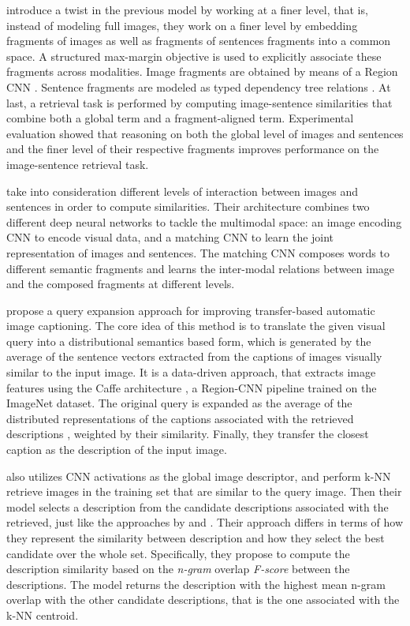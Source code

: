 \citet{Karpathy2014} introduce a twist in the previous model by working at a finer level, that is, instead of modeling full images, they work on a finer level by embedding fragments of images as well as fragments of sentences fragments into a common space.  A structured max-margin objective is used to explicitly associate these fragments across modalities. Image fragments are obtained by means of a Region CNN \citep{Girshick2014}. Sentence fragments are modeled as typed dependency tree relations \citep{DeMarneffe2006}. At last, a retrieval task is performed by computing image-sentence similarities that combine both a global term and a fragment-aligned term. Experimental evaluation showed that reasoning on both the global level of images and sentences and the finer level of their respective fragments improves performance on the image-sentence retrieval task.

\citet{Ma2015} take into consideration different levels of interaction between images and sentences in order to compute similarities. Their architecture combines two different deep neural networks to tackle the multimodal space: an image encoding CNN \citep{Simonyan2015} to encode visual data, and a matching CNN \citep{Hu2014} to learn the joint representation of images and sentences. The matching CNN composes words to different semantic fragments and learns the inter-modal relations between image and the composed fragments at different levels. 

\citet{Yagcioglu2015} propose a query expansion approach for improving transfer-based automatic image captioning. The core idea of this method is to translate the given visual query into a distributional semantics based form, which is generated by the average of the sentence vectors extracted from the captions of images visually similar to the input image. It is a data-driven approach, that extracts image features using the Caffe architecture \citep{Jia2014}, a Region-CNN pipeline trained on the ImageNet dataset. The original query is expanded as the average of the distributed representations of the captions associated with the retrieved descriptions \citep{Mikolov2013}, weighted by their similarity. Finally, they transfer the closest caption as the description of the input image.

\citet{Devlin2015} also utilizes CNN activations as the global image descriptor, and perform k-NN retrieve images in the training set that are similar to the query image. Then their model selects a description from the candidate descriptions associated with the retrieved, just like the approaches by \citet{Mason2015} and \citet{Yagcioglu2015}. Their approach differs in terms of how they represent the similarity between description and how they select the best candidate over the whole set. Specifically, they propose to compute the description similarity based on the \textit{n-gram} overlap \textit{F-score} between the descriptions. The model returns the description with the highest mean n-gram overlap with the other candidate descriptions, that is the one associated with the k-NN centroid.

